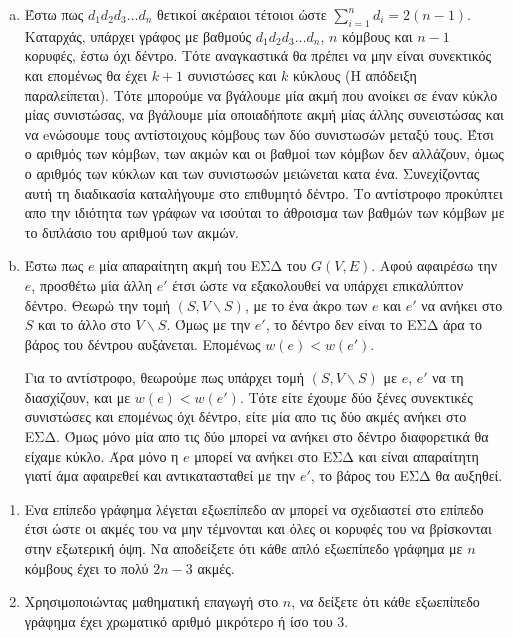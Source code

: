 \documentclass{assignment}
\begin{document}
\begin{enumerate}[(a)]

\item 
Έστω πως $d_1d_2d_3\dots d_n$ θετικοί ακέραιοι τέτοιοι ώστε $\sum_{i=1}^{n} d_i = 2(n-1)$. 
Καταρχάς, υπάρχει γράφος με βαθμούς $d_1d_2d_3\dots d_n$, $n$ κόμβους και $n-1$ κορυφές, έστω όχι δέντρο. 
Τότε αναγκαστικά θα πρέπει να μην είναι συνεκτικός και επομένως θα έχει $k+1$ συνιστώσες και $k$ κύκλους (Η απόδειξη παραλείπεται). 
Τότε μπορούμε να βγάλουμε μία ακμή που ανοίκει σε έναν κύκλο μίας συνιστώσας, να βγάλουμε μία οποιαδήποτε ακμή μίας άλλης 
συνειστώσας και να eνώσουμε τους αντίστοιχους κόμβους των δύο συνιστωσών μεταξύ τους. Έτσι ο αριθμός των κόμβων, 
των ακμών και οι βαθμοί των κόμβων δεν αλλάζουν, όμως ο αριθμός των κύκλων και των συνιστωσών μειώνεται κατα ένα. 
Συνεχίζοντας αυτή τη διαδικασία καταλήγουμε στο επιθυμητό δέντρο. Το αντίστροφο προκύπτει απο την ιδιότητα των γράφων
να ισούται το άθροισμα των βαθμών των κόμβων με το διπλάσιο του αριθμού των ακμών.
 
\item

Έστω πως $e$ μία απαραίτητη ακμή του ΕΣΔ του $G(V, E)$. Αφού αφαιρέσω την $e$, προσθέτω μία άλλη $e'$ έτσι ώστε να εξακολουθεί να 
υπάρχει επικαλύπτον δέντρο. Θεωρώ την τομή $(S, V \backslash S)$, με το ένα άκρο των $e$ και $e'$ να ανήκει στο $S$ και το 
άλλο στο $V \backslash S$. Όμως με την $e'$, το δέντρο δεν είναι το ΕΣΔ άρα το βάρος του δέντρου αυξάνεται. Επομένως $w(e) < w(e')$.

Για το αντίστροφο, θεωρούμε πως υπάρχει τομή $(S, V \backslash S)$ με $e$, $e'$ να τη διασχίζουν, και με $w(e) < w(e')$. Τότε είτε έχουμε 
δύο ξένες συνεκτικές συνιστώσες και επομένως όχι δέντρο, είτε μία απο τις δύο ακμές ανήκει στο ΕΣΔ. Όμως μόνο μία απο τις δύο μπορεί να ανήκει 
στο δέντρο διαφορετικά θα είχαμε κύκλο. Άρα μόνο η $e$ μπορεί να ανήκει στο ΕΣΔ και είναι απαραίτητη γιατί άμα αφαιρεθεί και αντικατασταθεί
με την $e'$, το βάρος του ΕΣΔ θα αυξηθεί.

\end{enumerate}


\begin{enumerate}

\item
Ενα επίπεδο γράφημα λέγεται εξωεπίπεδο αν μπορεί να σχεδιαστεί στο επίπεδο έτσι ώστε οι ακμές του να μην τέμνονται 
και όλες οι κορυφές του να βρίσκονται στην εξωτερική όψη. Να αποδείξετε ότι κάθε απλό εξωεπίπεδο γράφημα με $n$ κόμβους έχει 
το πολύ $2n-3$ ακμές. 

\item
Χρησιμοποιώντας μαθηματική επαγωγή στο $n$, να δείξετε ότι κάθε εξωεπίπεδο γράφημα έχει χρωματικό αριθμό μικρότερο ή ίσο του 3.

\end{enumerate}
\end{document}
